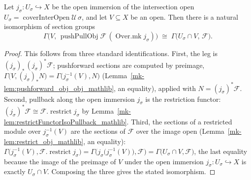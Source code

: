 \begin{lemma}\label{mk-lem:pushPull_leg_sections}
  \leanok

  Let \(j_\sigma : U_\sigma \hookrightarrow X\) be the open immersion of the intersection
  open \(U_\sigma = \operatorname{coverInterOpen}\mathcal{U}\,\sigma\), and let
  \(V \subseteq X\) be an open. Then there is a natural isomorphism of section groups
  \[
    \Gamma\bigl(V,\, \operatorname{pushPullObj}\mathcal{F}\,(\operatorname{Over.mk}
      j_\sigma)\bigr)
      \;\cong\;
    \Gamma\bigl(U_\sigma \cap V,\, \mathcal{F}\bigr).
  \]
\end{lemma}
\begin{proof}
  This follows from three standard identifications. First, the leg is
  \((j_\sigma)_*\,(j_\sigma)^*\mathcal{F}\); pushforward sections are computed by preimage,
  \(\Gamma\bigl(V, (j_\sigma)_* N\bigr) = \Gamma\bigl(j_\sigma^{-1}(V), N\bigr)\)
  (Lemma~\ref{mk-lem:pushforward_obj_obj_mathlib}, an equality), applied with \(N =
  (j_\sigma)^*\mathcal{F}\). Second, pullback along the open immersion \(j_\sigma\) is the
  restriction functor: \((j_\sigma)^*\mathcal{F} \cong \mathcal{F}.\operatorname{restrict}
  j_\sigma\) by Lemma~\ref{mk-lem:restrictFunctorIsoPullback_mathlib}. Third, the sections of a
  restricted module over \(j_\sigma^{-1}(V)\) are the sections of \(\mathcal{F}\) over the
  image open (Lemma~\ref{mk-lem:restrict_obj_mathlib}, an equality): \(\Gamma\bigl(j_\sigma^{-1}
  (V), \mathcal{F}.\operatorname{restrict} j_\sigma\bigr) = \Gamma\bigl(j_\sigma\bigl(
  j_\sigma^{-1}(V)\bigr), \mathcal{F}\bigr) = \Gamma\bigl(U_\sigma \cap V, \mathcal{F}\bigr)\),
  the last equality because the image of the preimage of \(V\) under the open immersion
  \(j_\sigma : U_\sigma \hookrightarrow X\) is exactly \(U_\sigma \cap V\). Composing the
  three gives the stated isomorphism.
\end{proof}

